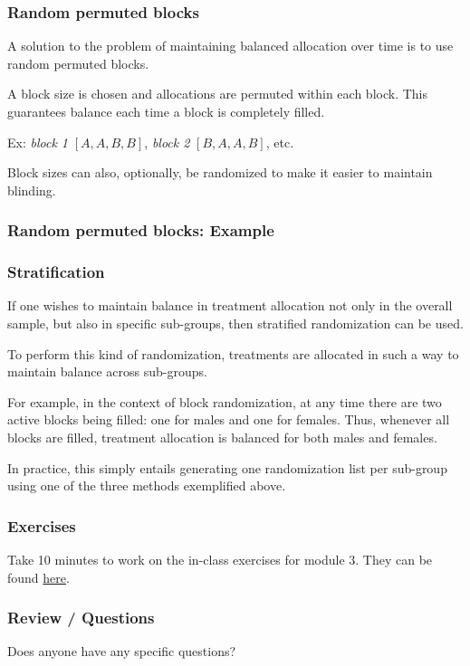 \documentclass{beamer}
\begin{document}
\begin{frame}
    \frametitle{Random permuted blocks}
	A solution to the problem of maintaining balanced allocation over time is to use random permuted blocks.

    \bigskip

    A block size is chosen and allocations are permuted within each block.
    This guarantees balance each time a block is completely filled.

    \bigskip

    Ex: \emph{block 1} $[A, A, B, B]$, \emph{block 2} $[B, A, A, B]$, etc.

    \bigskip

    Block sizes can also, optionally, be randomized to make it easier to maintain blinding.
\end{frame}


\begin{frame}[fragile]
    \frametitle{Random permuted blocks: Example}
	
\end{frame}


\begin{frame}
    \frametitle{Stratification}
    If one wishes to maintain balance in treatment allocation not only in the overall sample, but also
    in specific sub-groups, then stratified randomization can be used.

    \bigskip

    To perform this kind of randomization, treatments are allocated in such a way to maintain balance across sub-groups.

    \bigskip

    For example, in the context of block randomization, at any time there are two active blocks being filled:
    one for males and one for females. Thus, whenever all blocks are filled, treatment allocation is balanced
    for both males and females.

    \bigskip

    In practice, this simply entails generating one randomization list per sub-group using one of the three
    methods exemplified above.
\end{frame}


\begin{frame}
    \frametitle{Exercises}
    Take 10 minutes to work on the in-class exercises for module 3.
    They can be found \href{https://github.com/rnitulescu/RcourseOncology2020/blob/master/exercises3.R}{here}.
\end{frame}


\begin{frame}
    \frametitle{Review / Questions}
    \vfill
    Does anyone have any specific questions?
    \vfill
\end{frame}


\end{document}
